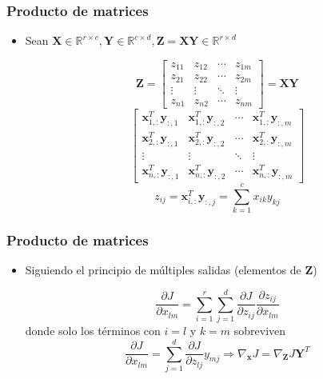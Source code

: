 \documentclass{beamer}
\begin{document}
\begin{frame}
\frametitle{Producto de matrices}
\begin{itemize}
\item Sean $\boldsymbol{X} \in \mathbb{R}^{r\times c}, \boldsymbol{Y} \in \mathbb{R}^{c\times d}, \boldsymbol{Z}=\boldsymbol{XY} \in \mathbb{R}^{r\times d}$

\begin{equation*}
\boldsymbol{Z}= \begin{bmatrix}
z_{11} & z_{12} & \cdots & z_{1m}\\
z_{21} & z_{22} & \cdots & z_{2m}\\
\vdots & \vdots & \ddots & \vdots \\
z_{n1} & z_{n2} & \cdots & z_{nm}
\end{bmatrix} =\boldsymbol{XY}
\end{equation*}
\begin{equation*}
 \begin{bmatrix}
\boldsymbol{x}^{T}_{1,:}\boldsymbol{y}_{:,1} & \boldsymbol{x}^{T}_{1,:}\boldsymbol{y}_{:,2} & \cdots & \boldsymbol{x}^{T}_{1,:}\boldsymbol{y}_{:,m}\\
\boldsymbol{x}^{T}_{2,:}\boldsymbol{y}_{:,1} & \boldsymbol{x}^{T}_{2,:}\boldsymbol{y}_{:,2} & \cdots & \boldsymbol{x}^{T}_{2,:}\boldsymbol{y}_{:,m}\\
\vdots & \vdots & \ddots & \vdots \\
\boldsymbol{x}^{T}_{n,:}\boldsymbol{y}_{:,1} & \boldsymbol{x}^{T}_{n,:}\boldsymbol{y}_{:,2} & \cdots & \boldsymbol{x}^{T}_{n,:}\boldsymbol{y}_{:,m}
\end{bmatrix}
\end{equation*}
\begin{equation*}
z_{ij}=\boldsymbol{x}^{T}_{i,:}\boldsymbol{y}_{:,j}=\sum_{k=1}^{c}x_{ik}y_{kj}
\end{equation*}
\end{itemize}
\end{frame}
\begin{frame}
\frametitle{Producto de matrices}
\begin{itemize}
\item Siguiendo el principio de múltiples salidas (elementos de $\boldsymbol{Z}$)

\begin{equation*}
\frac{\partial J}{\partial x_{lm}}=\sum_{i=1}^{r}\sum_{j=1}^{d}\frac{\partial J}{\partial z_{ij}}\frac{\partial z_{ij}}{\partial x_{lm}}
\end{equation*}
donde solo los términos con $i=l$ y $k=m$ sobreviven
\begin{equation*}
\frac{\partial J}{\partial x_{lm}}=\sum_{j=1}^{d}\frac{\partial J}{\partial z_{lj}}y_{mj} \Rightarrow \nabla_{\boldsymbol{x}}J= \nabla_{\boldsymbol{Z}} J\boldsymbol{Y}^T
\end{equation*}
\end{itemize}
\end{frame}
\end{document}
